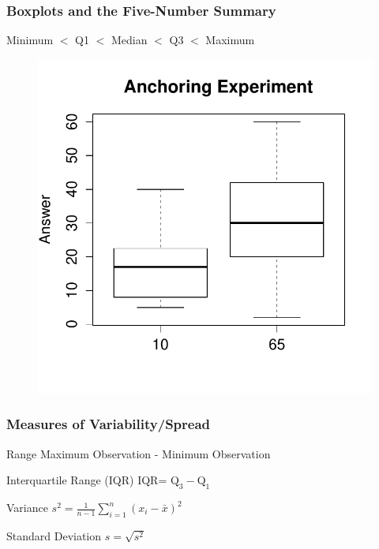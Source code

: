 \begin{frame}
\frametitle{Boxplots and the Five-Number Summary}
Minimum $<$ Q1 $<$ Median $<$ Q3 $<$ Maximum

\begin{figure}
\centering \includegraphics[scale = 0.65]{./images/anchoring_boxplot}
\end{figure}

\end{frame}

\begin{frame}
\frametitle{Measures of Variability/Spread}

\begin{block}{Range}
Maximum Observation - Minimum Observation
\end{block}
\pause
\begin{block}{Interquartile Range (IQR)}
IQR= $\mbox{Q}_3 - \mbox{Q}_1$
\end{block}
\pause
\begin{block}{Variance}
$\displaystyle s^2 = \frac{1}{n-1} \sum_{i=1}^n (x_i - \bar{x})^2$
\end{block}
\pause
 \begin{block}{Standard Deviation}
	$s = \sqrt{s^2}$
\end{block}
\end{frame}

